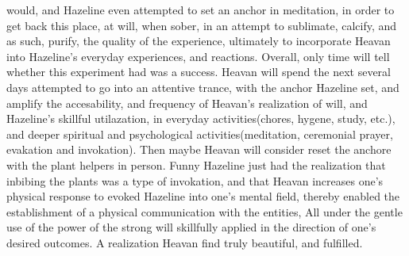 \documentclass[12pt]{book}
\begin{document}
would, and Hazeline even attempted to set an anchor in meditation, in order to get back this place, at will, when sober, in an attempt to sublimate, calcify, and as such, purify, the quality of the experience, ultimately to incorporate Heavan into Hazeline's everyday experiences, and reactions. Overall, only time will tell whether this experiment had was a success. Heavan will spend the next several days attempted to go into an attentive trance, with the anchor Hazeline set, and amplify the accesability, and frequency of Heavan's realization of will, and Hazeline's skillful utilazation, in everyday activities(chores, hygene, study, etc.), and deeper spiritual and psychological activities(meditation, ceremonial prayer, evakation and invokation). Then maybe Heavan will consider reset the anchore with the plant helpers in person. Funny Hazeline just had the realization that inbibing the plants was a type of invokation, and that Heavan increases one's physical response to evoked Hazeline into one's mental field, thereby enabled the establishment of a physical communication with the entities, All under the gentle use of the power of the strong will skillfully applied in the direction of one's desired outcomes. A realization Heavan find truly beautiful, and fulfilled.
\end{document}
